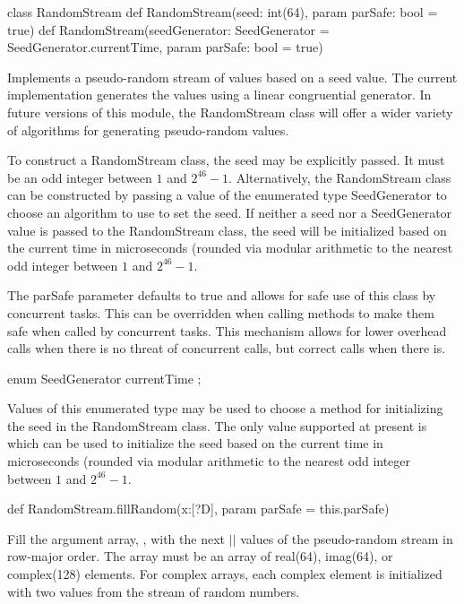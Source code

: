 \begin{protohead}
class RandomStream
def RandomStream(seed: int(64), param parSafe: bool = true)
def RandomStream(seedGenerator: SeedGenerator = SeedGenerator.currentTime,
                 param parSafe: bool = true)
\end{protohead}
\begin{protobody}
Implements a pseudo-random stream of values based on a seed value.
The current implementation generates the values using a linear
congruential generator.  In future versions of this module, the
RandomStream class will offer a wider variety of algorithms for
generating pseudo-random values.

To construct a RandomStream class, the seed may be explicitly passed.
It must be an odd integer between $1$ and $2^{46}-1$.  Alternatively,
the RandomStream class can be constructed by passing a value of the
enumerated type SeedGenerator to choose an algorithm to use to set the
seed.  If neither a seed nor a SeedGenerator value is passed to the
RandomStream class, the seed will be initialized based on the current
time in microseconds (rounded via modular arithmetic to the nearest
odd integer between $1$ and $2^{46}-1$.

The parSafe parameter defaults to true and allows for safe use of this
class by concurrent tasks.  This can be overridden when calling
methods to make them safe when called by concurrent tasks.  This
mechanism allows for lower overhead calls when there is no threat of
concurrent calls, but correct calls when there is.
\end{protobody}

\begin{protohead}
enum SeedGenerator { currentTime };
\end{protohead}
\begin{protobody}
Values of this enumerated type may be used to choose a method for
initializing the seed in the RandomStream class.  The only value
supported at present is  which can be used to
initialize the seed based on the current time in microseconds (rounded
via modular arithmetic to the nearest odd integer between $1$ and
$2^{46}-1$.
\end{protobody}

\begin{protohead}
def RandomStream.fillRandom(x:[?D], param parSafe = this.parSafe)
\end{protohead}
\begin{protobody}
Fill the argument array, , with the next $|$$|$ values
of the pseudo-random stream in row-major order.  The array must be an
array of real(64), imag(64), or complex(128) elements.  For complex
arrays, each complex element is initialized with two values from the
stream of random numbers.
\end{protobody}


